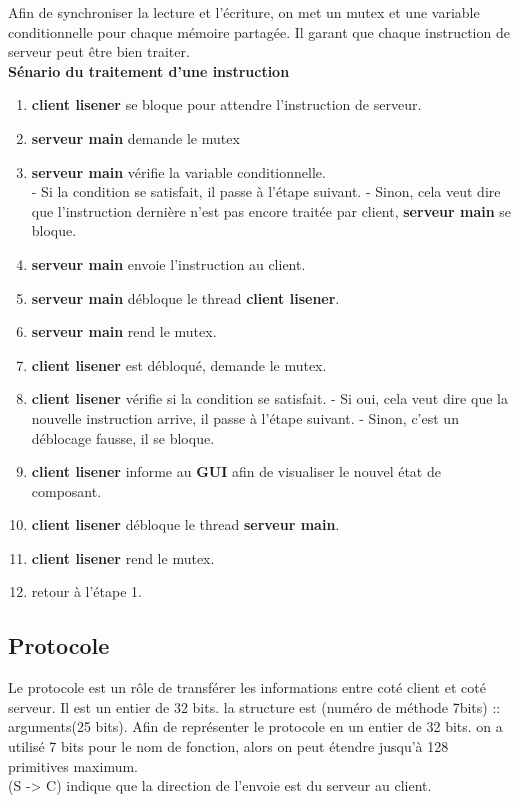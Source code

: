 \documentclass[14px]{article}
\begin{document}
Afin de synchroniser la lecture et l'écriture, on met un mutex et une variable conditionnelle pour chaque mémoire partagée. Il garant que chaque instruction de serveur peut être bien traiter.\\

\textbf{Sénario du traitement d'une instruction}
\begin{enumerate}
	\item \textbf{client lisener} se bloque pour attendre l'instruction de serveur.
	\item \textbf{serveur main} demande le mutex
	\item \textbf{serveur main} vérifie la variable conditionnelle.\\
	- Si la condition se satisfait, il passe à l'étape suivant.
	- Sinon, cela veut dire que l'instruction dernière n'est pas encore traitée par client, \textbf{serveur main} se bloque.
	\item \textbf{serveur main} envoie l'instruction au client.
	\item \textbf{serveur main} débloque le thread \textbf{client lisener}.
	\item \textbf{serveur main} rend le mutex.
	\item \textbf{client lisener} est débloqué, demande le mutex.
	\item \textbf{client lisener} vérifie si la condition se satisfait.
	- Si oui, cela veut dire que la nouvelle instruction arrive, il passe à l'étape suivant.
	- Sinon, c'est un déblocage fausse, il se bloque.
	\item \textbf{client lisener} informe au \textbf{GUI} afin de visualiser le nouvel état de composant.
	\item \textbf{client lisener} débloque le thread \textbf{serveur main}.
	\item \textbf{client lisener} rend le mutex.
	\item retour à l'étape 1.
\end{enumerate}

\clearpage

\subsection{Protocole}
Le protocole est un rôle de transférer les informations entre coté client et coté serveur. Il est un entier de 32 bits. la structure est (numéro de méthode 7bits) :: arguments(25 bits).
Afin de représenter le protocole en un entier de 32 bits. on a utilisé 7 bits pour le nom de fonction, alors on peut étendre jusqu'à 128 primitives maximum. \\
(S -> C) indique que la direction de l'envoie est du serveur au client.
\end{document}
